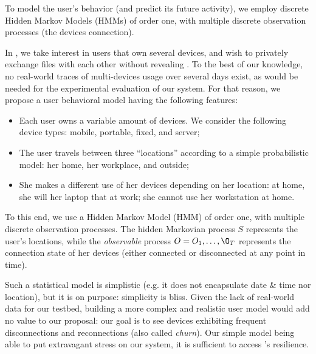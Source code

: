 To model the user's behavior (and predict its future activity), we employ discrete Hidden Markov Models (HMMs) of order one, with multiple discrete observation processes (the devices connection). 


In \name, we take interest in users that own several devices, and wish to privately exchange files with each other without revealing .
To the best of our knowledge, no real-world traces of multi-devices usage over several days exist, as would be needed for the experimental evaluation of our system.
For that reason, we propose a user behavioral model having the following features:

\begin{itemize}
	\item Each user owns a variable amount of devices. We consider the following device types: mobile, portable, fixed, and server;
	\item The user travels between three ``locations'' according to a simple probabilistic model: her home, her workplace, and outside;
	\item She makes a different use of her devices depending on her location: at home, she will her laptop that at work; she cannot use her workstation at home.
\end{itemize}

To this end, we use a Hidden Markov Model (HMM) of order one, with multiple discrete observation processes. 
The hidden Markovian process $S$ represents the user's locations, while the \emph{observable} process $O=O_1, \dots, \O_T$ represents the connection state of her devices (either connected or disconnected at any point in time).


Such a statistical model is simplistic (e.g. it does not encapsulate date \& time nor location), but it is on purpose: simplicity is bliss.
Given the lack of real-world data for our testbed, building a more complex and realistic user model would add no value to our proposal: 
our goal is to see devices exhibiting frequent disconnections and reconnections (also called \emph{churn}).
Our simple model being able to put extravagant stress on our system, it is sufficient to access \name's resilience.

